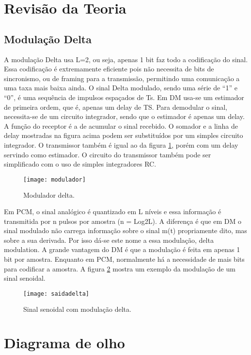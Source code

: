 \newpage
\section{Revisão da Teoria}

\subsection{Modulação Delta}

A modulação Delta usa L=2, ou seja, apenas 1 bit faz todo a codificação do sinal.
Essa codificação é extremamente eficiente pois não necessita de bits de sincronismo, ou de framing para a transmissão, permitindo uma comunicação a uma taxa mais baixa ainda. O sinal Delta modulado, sendo uma série de “1” e “0”, é uma sequência de impulsos espaçados de Ts. 
Em DM usa-se um estimador de primeira ordem, que é, apenas um delay de TS. Para demodular o sinal, necessita-se de um circuito integrador, sendo que o estimador é apenas um delay.
A função do receptor é a de acumular o sinal recebido. O somador e a linha de delay mostradas na figura acima podem ser substituídos por um simples circuito
integrador.
O transmissor também é igual ao da figura \ref{fig:modulador}, porém com um delay servindo como estimador. O circuito do transmissor também pode ser simplificado com o uso de simples integradores RC.
\begin{figure}[H]
    \centering
    \texttt{[image: modulador]}
    \caption{Modulador delta.}
    \label{fig:modulador}
\end{figure}

Em PCM, o sinal analógico é quantizado em L níveis e essa informação é transmitida por n pulsos por amostra (n = Log2L). A diferença é que em DM o sinal
modulado não carrega informação sobre o sinal m(t) propriamente dito, mas sobre a sua derivada. Por isso dá-se este nome a essa modulação, delta modulation.
A grande vantagem do DM é que a modulação é feita em apenas 1 bit por amostra. Enquanto em PCM, normalmente há a necessidade de mais bits para codificar a amostra. A figura \ref{fig:saidadelta} mostra um exemplo da modulação de um sinal senoidal.

\begin{figure}[H]
    \centering
    \texttt{[image: saidadelta]}
    \caption{Sinal senoidal com modulação delta.}
    \label{fig:saidadelta}
\end{figure}

\section{Diagrama de olho}

